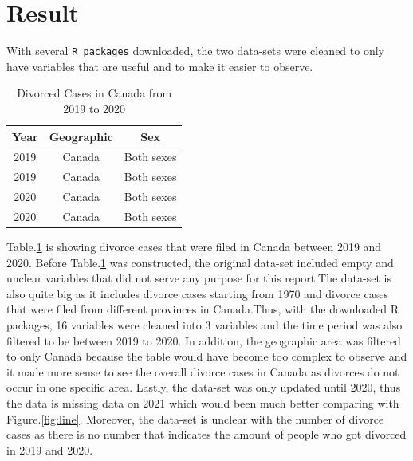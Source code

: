 \documentclass[
]{article}
\begin{document}
\hypertarget{result}{%
\section{Result}\label{result}}

With several \texttt{R\ packages} downloaded, the two data-sets were cleaned to only have variables that are useful and to make it easier to observe.

\begin{table}[H]

\caption{\label{tab:table}Divorced Cases in Canada from 2019 to 2020}
\centering
\begin{tabular}[t]{ccc}
\toprule
Year & Geographic & Sex\\
\midrule
2019 & Canada & Both sexes\\
2019 & Canada & Both sexes\\
2020 & Canada & Both sexes\\
2020 & Canada & Both sexes\\
\bottomrule
\end{tabular}
\end{table}

Table.\ref{tab:table} is showing divorce cases that were filed in Canada between 2019 and 2020. Before Table.\ref{tab:table} was constructed, the original data-set included empty and unclear variables that did not serve any purpose for this report.The data-set is also quite big as it includes divorce cases starting from 1970 and divorce cases that were filed from different provinces in Canada.Thus, with the downloaded R packages, 16 variables were cleaned into 3 variables and the time period was also filtered to be between 2019 to 2020. In addition, the geographic area was filtered to only Canada because the table would have become too complex to observe and it made more sense to see the overall divorce cases in Canada as divorces do not occur in one specific area. Lastly, the data-set was only updated until 2020, thus the data is missing data on 2021 which would been much better comparing with Figure.\ref{fig:line}. Moreover, the data-set is unclear with the number of divorce cases as there is no number that indicates the amount of people who got divorced in 2019 and 2020.
\end{document}
